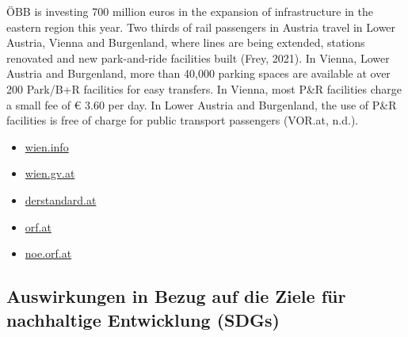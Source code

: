 \documentclass[
]{book}
\providecommand{\tightlist}{%
  \setlength{\itemsep}{0pt}\setlength{\parskip}{0pt}}
\begin{document}
ÖBB is investing 700 million euros in the expansion of infrastructure in the eastern region this year. Two thirds of rail passengers in Austria travel in Lower Austria, Vienna and Burgenland, where lines are being extended, stations renovated and new park-and-ride facilities built (Frey, 2021). In Vienna, Lower Austria and Burgenland, more than 40,000 parking spaces are available at over 200 Park/B+R facilities for easy transfers. In Vienna, most P\&R facilities charge a small fee of € 3.60 per day. In Lower Austria and Burgenland, the use of P\&R facilities is free of charge for public transport passengers (VOR.at, n.d.).

\begin{itemize}
\tightlist
\item
  \href{https://www.wien.info/de/reiseinfos/anreise/parkgaragen}{wien.info}
\item
  \href{https://www.wien.gv.at/verkehr/parken/garagen/}{wien.gv.at}
\item
  \href{https://www.derstandard.at/story/2000106482985/volle-park-and-ride-plaetze-frustrieren-wien-pendler}{derstandard.at}
\item
  \href{https://orf.at/stories/3151437/}{orf.at}
\item
  \href{https://noe.orf.at/stories/3030525/}{noe.orf.at}
\end{itemize}

\hypertarget{auswirkungen-in-bezug-auf-die-ziele-fuxfcr-nachhaltige-entwicklung-sdgs-25}{%
\subsection*{Auswirkungen in Bezug auf die Ziele für nachhaltige Entwicklung (SDGs)}\label{auswirkungen-in-bezug-auf-die-ziele-fuxfcr-nachhaltige-entwicklung-sdgs-25}}
\end{document}
